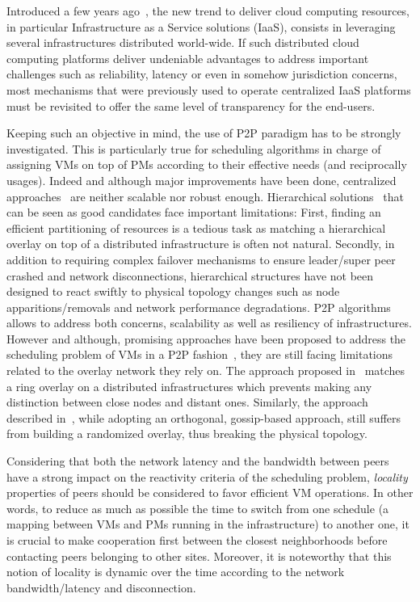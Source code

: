 Introduced a few years ago~\cite{greenberg:sigcomm09}, the new trend to deliver cloud
computing resources, in particular Infrastructure as a Service solutions (IaaS), consists
in leveraging several infrastructures distributed world-wide. If such distributed cloud
computing platforms deliver undeniable advantages to address important challenges such as
reliability, latency or even in somehow jurisdiction concerns, most mechanisms that were
previously used to operate centralized IaaS platforms must be revisited to offer the same
level of transparency for the end-users.

Keeping such an objective in mind, the use of P2P paradigm has to be strongly
investigated. This is particularly true for scheduling algorithms in charge
of assigning VMs on top of PMs according to their effective needs (and reciprocally
usages). Indeed and although major improvements have been done, centralized
approaches~\cite{hermenier:2013} are neither scalable nor robust enough. Hierarchical
solutions~\cite{feller:ccgrid12} that can be seen as good candidates face important
limitations: First, finding an efficient partitioning of resources is a tedious task as
matching a hierarchical overlay on top of a distributed infrastructure is often not
natural. Secondly, in addition to requiring complex failover mechanisms to ensure
leader/super peer crashed and network disconnections, hierarchical structures have not
been designed to react swiftly to physical topology changes such as node
apparitions/removals and network performance degradations. P2P algorithms allows to
address both concerns, \ie scalability as well as resiliency of infrastructures. However
and although, promising approaches have been proposed to address the scheduling problem of
VMs in a P2P fashion~\cite{quesnel:cpe2012,feller:cloudcom12}, they are still facing
limitations related to the overlay network they rely on. The approach proposed
in~\cite{quesnel:cpe2012} matches a ring overlay on a distributed infrastructures which
prevents making any distinction between close nodes and distant ones. Similarly, the
approach described in~\cite{feller:cloudcom12}, while adopting an orthogonal, gossip-based approach,
still suffers from building a randomized overlay, thus breaking the physical topology.

Considering that both the network latency and the bandwidth between peers have a strong
impact on the reactivity criteria of the scheduling problem, \emph{locality} properties of
peers should be considered to favor efficient VM operations. In other words, to reduce as
much as possible the time to switch from one schedule (\ie a mapping between VMs and PMs
running in the infrastructure) to another one, it is crucial to make cooperation first
between the closest neighborhoods before contacting peers belonging to other sites.
Moreover, it is noteworthy that this notion of locality is dynamic over the time according
to the network bandwidth/latency and disconnection.

